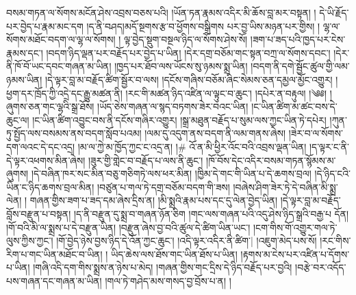 བསམ་གཏན་ལ་སོགས་མངོན་ཤེས་འབྲས་བཅས་པའི། །ཡོན་ཏན་རྣམས་འདིར་མི་ཆོས་བླ་མར་བསྟན། ། དེ་ཡི་རྗོད་པར་བྱེད་པ་རྣམ་མང་དག །ད་ནི་བཤད།མདོ་སྔགས་རྩ་བ་ཕྱོགས་བསྒྲིགས པར་བྱ་ཡིས་མཉན་པར་གྱིས། ། ལྷ་ལ་སོགས་མཐོང་བདག་ལ་ལྷ་ལ་སོགས། ། ལྟ་བྱེད་སྡུག་བསྔལ་ཉིད་ལ་སོགས་ཤེས་སོ། །ཟག་པ་ཟད་པའི་ཁྱད་པར་ངེས་རྣམས་དང་། །བདག་ཉིད་ལྡན་པར་བརྗོད་པར་བྱེད་པ་ཡིན། །དེར་དགྲ་བཅོམ་གང་སྟན་བཀྲ་ལ་སོགས་དབང་། །དེར་ནི་ཁོ་བོ་ཡང་དབང་གཞན་མ་ཡིན། །ཁྱད་པར་ཐོབ་ལས་ཡོངས་སུ་ཉམས་སྨྲ་ཡིན། །བདག་ནི་དགེ་སྦྱོང་ཚུལ་གྱི་ལམ་ཉམས་ཡིན། །དེ་ལྟར་བླ་མ་བརྗོད་ཚིག་སྦྱོར་བ་ལས། །དངོས་གཞིས་བཅོམ་ཞིང་སེམས་ཅན་དམྱལ་མྱོང་འགྱུར། །ཕྱག་དར་ཁྲོད་ཀྱི་འདྲེ་དང་རྒྱུ་མཚན་ནི། །རང་གི་མཚན་ཉིད་འཛིན་ལ་ལྟུང་བ་ཆུང་། །དཔེར་ན་བརྟུལ། །༄༅། །ཞུགས་ཅན་གང་ལྷའི་སྒྲ་ཐོས། །ཡོད་ཅེས་གཞན་ལ་སྙད་བཏགས་ཟེར་བའང་ཡིན། །ང་ཡིན་ཚིག་མ་ཚང་བས་དེ་ཆུང་ལ། །ང་ཡིན་ཚིག་འབྱུང་བས་ནི་དངོས་གཞིར་འགྱུར། །སྒྲ་མཐུན་བརྗོད་པ་སུམ་ལས་ཀྱང་ཡིན་ཏེ་དཔེར། །ཀུན་ཏུ་སྤྱོད་ལས་བསམས་ནས་བདག་སློབ་པའམ། །ལམ་དུ་འདུག་ནས་བདག་ནི་ལམ་གནས་ཞེས། །ཟེར་བ་ལ་སོགས་དག་ལའང་དེ་དང་འདྲ། །མ་ལ་ཀྱེ་མ་ཁྱོད་ཀྱང་ང་འདྲ་ན། །# འོ་ན་མི་ཕྱིར་འོང་བའི་འབྲས་ལྡན་ཡིན། །ད་ལྟར་ང་ནི་དེ་ལྟར་འཕགས་མིན་ཞེས། །ཟུར་གྱི་གླེང་བ་བརྗོད་པ་ལས་ནི་ཆུང་། །ཁོ་བོས་དེང་འདིར་བསམ་གཏན་སྙོམས་མ་ཞུགས། །དེ་བཞིན་ཁར་སང་མིན་བཅུ་གཅིགཏེ་ལས་ཕར་མིན། །ཁྱིམ་དེ་གང་གི་ཡིན་པ་དེ་ཆགས་བྲལ། །དེ་ཉིད་ངའི་ཡིན་ང་ཉིད་ཆགས་བྲལ་མིན། །བཙུན་པ་གལ་ཏེ་དགྲ་བཅོམ་བདག་གི་ཟས། །བཞེས་ཤིག་ཟེར་ཏེ་དེ་བཞིན་མི་སྨྲ་ལེན། ། གཞན་གྱིས་ཟག་པ་ཟད་དམ་ཞེས་དྲིས་ན། །མི་སྨྲའི་རྣམ་པས་དང་དུ་ལེན་བྱེད་ཡིན། །དེ་ལྟར་བླ་མ་བརྗོད་བློས་བརྫུན་པ་བསྟན། །ད་ནི་བརྫུན་དུ་སྨྲ་བ་གཞན་ཉོན་ཅིག །གང་ལས་གཞན་པའི་འདུ་ཤེས་ཉིད་སྒྲའི་བརྒྱ་པ དོན། །གོ་བའི་མི་ལ་སྨྲས་པ་དེ་བརྫུན་ཡིན། །བརྫུན་ཞེས་བྱ་བའི་ཚུལ་དེ་ཚིག་ཡིན་ཡང་། །ངག་གིས་གོ་འགྱུར་གལ་ཏེ་ལུས་ཀྱིས་ཀྱང་། །གོ་བྱེད་ཉེས་བྱས་ཉིད་དེ་འོན་ཀྱང་ཆུང་། །འདི་ལྟར་འདིར་ནི་ཚིག་| །འཇུག་མེད་པས་སོ། །རང་གིས་རིག་པ་གང་ཡིན་མཐོང་བ་ཡིན། ། ཡིད་ཆེས་ལས་ཐོས་གང་ཡིན་ཐོས་པ་ཡིན། །རྟགས་མ་ངེས་པར་འཛིན་པ་དོགས་པ་ཡིན། །གཞི་འདི་དག་གིས་སྨྲས་ན་ཉེས་པ་མེད། །གཞན་གྱིས་གང་དྲིས་དེ་ཉིད་བརྗོད་པར་བྱའི། །བརྩེ་བར་འདོད་པས་གཞན་དང་གཞན་མ་ཡིན། །གལ་ཏེ་གཤེད་མས་གསད་བྱ་བྲོས་པ་ན། །
